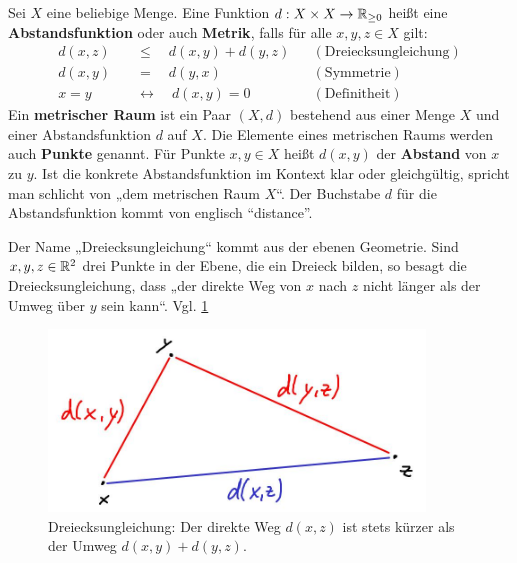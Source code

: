 \begin{defin}[* Abstandsfunktion] \label{def:abstand}    
    Sei $X$ eine beliebige Menge. Eine Funktion $d:X\times X\to \mathbb R_{\ge 0}$ heißt eine \textbf{Abstandsfunktion} oder auch \textbf{Metrik}, falls für alle $x,y,z\in X$ gilt:
    \begin{align*}
        d(x,z) \quad&\le\quad d(x,y)+d(y,z) && (\text{Dreiecksungleichung}) \\
        d(x,y) \quad&=\quad d(y,x) && (\text{Symmetrie}) \\
        x=y \quad&\leftrightarrow\quad d(x,y)=0 && (\text{Definitheit})
    \end{align*}
    Ein \textbf{metrischer Raum} ist ein Paar $(X,d)$ bestehend aus einer Menge $X$ und einer Abstandsfunktion $d$ auf $X$. Die Elemente eines metrischen Raums werden auch \textbf{Punkte} genannt. Für Punkte $x,y\in X$ heißt $d(x,y)$ der \textbf{Abstand} von $x$ zu $y$. Ist die konkrete Abstandsfunktion im Kontext klar oder gleichgültig, spricht man schlicht von „dem metrischen Raum $X$“. Der Buchstabe $d$ für die Abstandsfunktion kommt von englisch ``distance''. 
\end{defin}


\begin{bem}
    Der Name „Dreiecksungleichung“ kommt aus der ebenen Geometrie. Sind $x,y,z\in \mathbb R^2$ drei Punkte in der Ebene, die ein Dreieck bilden, so besagt die Dreiecksungleichung, dass „der direkte Weg von $x$ nach $z$ nicht länger als der Umweg über $y$ sein kann“. Vgl. \cref{fig:dreiecksungleichung}
    \begin{figure}[ht]
        \includegraphics[width=10cm]{./_img/Dreiecksungleichung.jpeg}
        \centering \caption{Dreiecksungleichung: Der direkte Weg $d(x,z)$ ist stets kürzer als der Umweg $d(x,y)+d(y,z)$.}
        \label{fig:dreiecksungleichung}
    \end{figure}
\end{bem}


